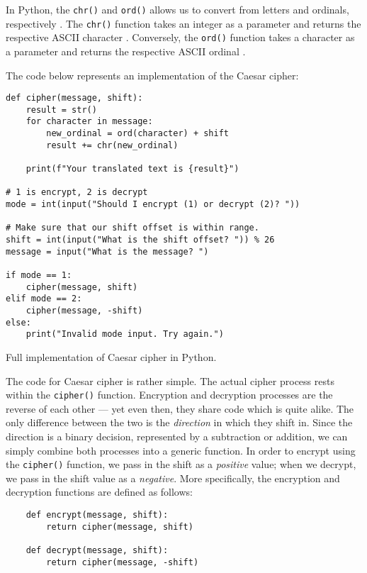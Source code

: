 In Python, the \texttt{chr()} and \texttt{ord()} allows us to convert from letters and ordinals, respectively \cite{caesar_cipher_invent_with_python}. 
The \texttt{chr()} function takes an integer as a parameter and returns the respective ASCII character \cite{caesar_cipher_invent_with_python}. Conversely, 
the \texttt{ord()} function takes a character as a parameter and returns the respective ASCII ordinal \cite{caesar_cipher_invent_with_python}. 

The code below represents an implementation of the Caesar cipher:

\begin{listing}[H]
    \begin{verbatim}
def cipher(message, shift):
    result = str()
    for character in message:
        new_ordinal = ord(character) + shift
        result += chr(new_ordinal)
        
    print(f"Your translated text is {result}")
    
# 1 is encrypt, 2 is decrypt
mode = int(input("Should I encrypt (1) or decrypt (2)? "))
    
# Make sure that our shift offset is within range.
shift = int(input("What is the shift offset? ")) % 26
message = input("What is the message? ")
    
if mode == 1:
    cipher(message, shift)
elif mode == 2:
    cipher(message, -shift)
else:
    print("Invalid mode input. Try again.")    
    \end{verbatim}
    \caption{Full implementation of Caesar cipher in Python.}
\end{listing}

The code for Caesar cipher is rather simple. The actual cipher process rests within the \texttt{cipher()} function.
Encryption and decryption processes are the reverse of each other --- yet even then, they share code which is quite alike.
The only difference between the two is the \textit{direction} in which they shift in. Since the direction is a binary decision, 
represented by a subtraction or addition, we can simply combine both processes into a generic function. In order to encrypt
using the \texttt{cipher()} function, we pass in the shift as a \textit{positive} value; when we decrypt, we pass in the shift
value as a \textit{negative}. More specifically, the encryption and decryption functions are defined as follows:

\begin{listing}[H]
    \begin{verbatim}
    def encrypt(message, shift):
        return cipher(message, shift)
    
    def decrypt(message, shift):
        return cipher(message, -shift)
    \end{verbatim}
\end{listing}

